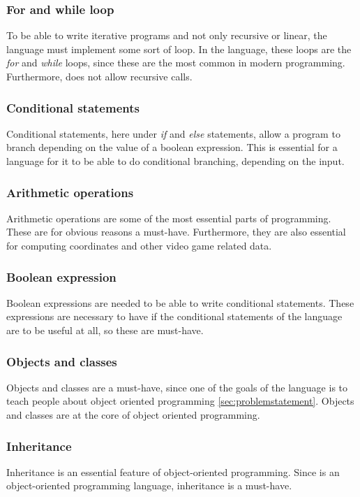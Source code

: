 \subsubsection*{For and while loop}
To be able to write iterative programs and not only recursive or linear, the language must implement some sort of loop. In the \lang{} language, these loops are the \textit{for} and \textit{while} loops, since these are the most common in modern programming. Furthermore, \lang{} does not allow recursive calls.

\subsubsection*{Conditional statements}
Conditional statements, here under \textit{if} and \textit{else} statements, allow a program to branch depending on the value of a boolean expression. This is essential for a language for it to be able to do conditional branching, depending on the input.

\subsubsection*{Arithmetic operations}
Arithmetic operations are some of the most essential parts of programming. These are for obvious reasons a must-have. Furthermore, they are also essential for computing coordinates and other video game related data.

\subsubsection*{Boolean expression}
Boolean expressions are needed to be able to write conditional statements. These expressions are necessary to have if the conditional statements of the language are to be useful at all, so these are must-have.

\subsubsection*{Objects and classes}
Objects and classes are a must-have, since one of the goals of the \lang{} language is to teach people about object oriented programming \ref{sec:problemstatement}. Objects and classes are at the core of object oriented programming.

\subsubsection*{Inheritance}
Inheritance is an essential feature of object-oriented programming. Since \lang{} is an object-oriented programming language, inheritance is a must-have.

